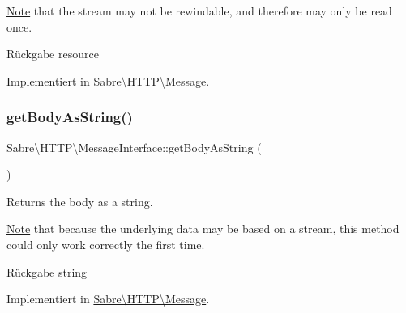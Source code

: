 \mbox{\hyperlink{class_note}{Note}} that the stream may not be rewindable, and therefore may only be read once.

\begin{DoxyReturn}{Rückgabe}
resource 
\end{DoxyReturn}


Implementiert in \mbox{\hyperlink{class_sabre_1_1_h_t_t_p_1_1_message_ae4b1d83743287c4e0f6500fbb4ff3c13}{Sabre\textbackslash{}\+H\+T\+T\+P\textbackslash{}\+Message}}.

\mbox{\label{interface_sabre_1_1_h_t_t_p_1_1_message_interface_a2e5fd4e2e19115840ba859a096666d9d}} 
\subsubsection{\texorpdfstring{get\+Body\+As\+String()}{getBodyAsString()}}
{\footnotesize\ttfamily Sabre\textbackslash{}\+H\+T\+T\+P\textbackslash{}\+Message\+Interface\+::get\+Body\+As\+String (\begin{DoxyParamCaption}{ }\end{DoxyParamCaption})}

Returns the body as a string.

\mbox{\hyperlink{class_note}{Note}} that because the underlying data may be based on a stream, this method could only work correctly the first time.

\begin{DoxyReturn}{Rückgabe}
string 
\end{DoxyReturn}


Implementiert in \mbox{\hyperlink{class_sabre_1_1_h_t_t_p_1_1_message_aa6a73aa5da947ec18adcf254abb4c0ef}{Sabre\textbackslash{}\+H\+T\+T\+P\textbackslash{}\+Message}}.

\mbox{\label{interface_sabre_1_1_h_t_t_p_1_1_message_interface_ac83dfeddea2be33e620b32b07ae057c5}} 

